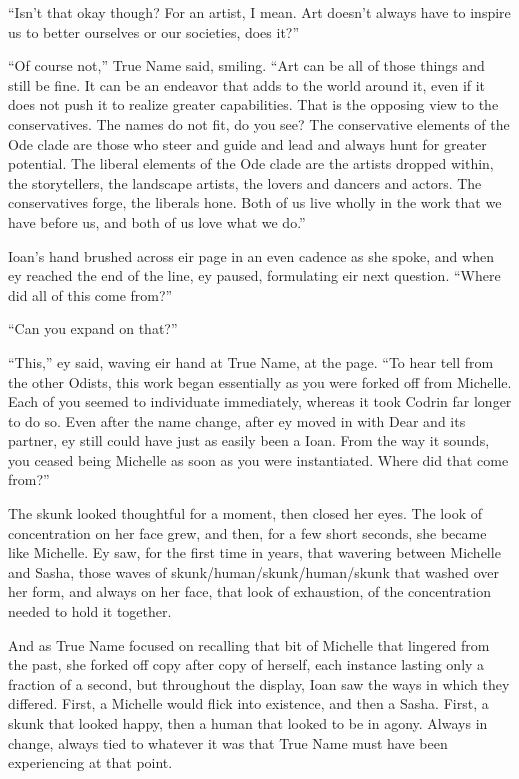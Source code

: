 ``Isn't that okay though? For an artist, I mean. Art doesn't always have to inspire us to better ourselves or our societies, does it?''

``Of course not,'' True Name said, smiling. ``Art can be all of those things and still be fine. It can be an endeavor that adds to the world around it, even if it does not push it to realize greater capabilities. That is the opposing view to the conservatives. The names do not fit, do you see? The conservative elements of the Ode clade are those who steer and guide and lead and always hunt for greater potential. The liberal elements of the Ode clade are the artists dropped within, the storytellers, the landscape artists, the lovers and dancers and actors. The conservatives forge, the liberals hone. Both of us live wholly in the work that we have before us, and both of us love what we do.''

Ioan's hand brushed across eir page in an even cadence as she spoke, and when ey reached the end of the line, ey paused, formulating eir next question. ``Where did all of this come from?''

``Can you expand on that?''

``This,'' ey said, waving eir hand at True Name, at the page. ``To hear tell from the other Odists, this work began essentially as you were forked off from Michelle. Each of you seemed to individuate immediately, whereas it took Codrin far longer to do so. Even after the name change, after ey moved in with Dear and its partner, ey still could have just as easily been a Ioan. From the way it sounds, you ceased being Michelle as soon as you were instantiated. Where did that come from?''

The skunk looked thoughtful for a moment, then closed her eyes. The look of concentration on her face grew, and then, for a few short seconds, she became like Michelle. Ey saw, for the first time in years, that wavering between Michelle and Sasha, those waves of skunk/human/skunk/human/skunk that washed over her form, and always on her face, that look of exhaustion, of the concentration needed to hold it together.

And as True Name focused on recalling that bit of Michelle that lingered from the past, she forked off copy after copy of herself, each instance lasting only a fraction of a second, but throughout the display, Ioan saw the ways in which they differed. First, a Michelle would flick into existence, and then a Sasha. First, a skunk that looked happy, then a human that looked to be in agony. Always in change, always tied to whatever it was that True Name must have been experiencing at that point.


